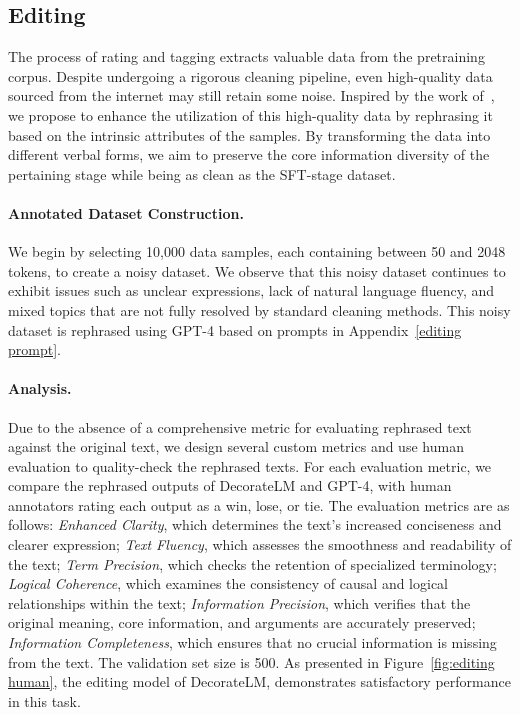 \documentclass[11pt]{article}
\begin{document}
\subsection{Editing}
The process of rating and tagging extracts valuable data from the pretraining corpus. Despite undergoing a rigorous cleaning pipeline, even high-quality data sourced from the internet may still retain some noise. Inspired by the work of~\citep{maini2024rephrasing}, we propose to enhance the utilization of this high-quality data by rephrasing it based on the intrinsic attributes of the samples. By transforming the data into different verbal forms, we aim to preserve the core information diversity of the pertaining stage while being as clean as the SFT-stage dataset. 
\paragraph{Annotated Dataset Construction.}
We begin by selecting 10,000 data samples, each containing between 50 and 2048 tokens, to create a noisy dataset. We observe that this noisy dataset continues to exhibit issues such as unclear expressions, lack of natural language fluency, and mixed topics that are not fully resolved by standard cleaning methods. 
This noisy dataset is rephrased using GPT-4 based on prompts in Appendix~\ref{editing prompt}.
\paragraph{Analysis.}
Due to the absence of a comprehensive metric for evaluating rephrased text against the original text, we design several custom metrics and use human evaluation to quality-check the rephrased texts. For each evaluation metric, we compare the rephrased outputs of DecorateLM and GPT-4, with human annotators rating each output as a win, lose, or tie. The evaluation metrics are as follows: \textit{Enhanced Clarity}, which determines the text's increased conciseness and clearer expression; \textit{Text Fluency}, which assesses the smoothness and readability of the text; \textit{Term Precision}, which checks the retention of specialized terminology; \textit{Logical Coherence}, which examines the consistency of causal and logical relationships within the text; \textit{Information Precision}, which verifies that the original meaning, core information, and arguments are accurately preserved; \textit{Information Completeness}, which ensures that no crucial information is missing from the text. 
The validation set size is 500. As presented in Figure~\ref{fig:editing human}, the editing model of DecorateLM, demonstrates satisfactory performance in this task.
\end{document}
